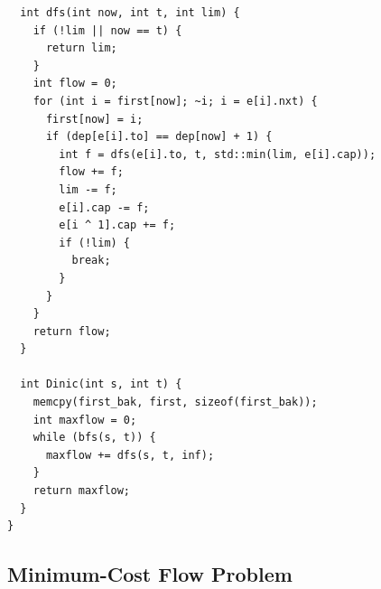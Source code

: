 \documentclass[9pt,landscape]{article}
\begin{document}
\begin{multicols}{2}
\begin{lstlisting}
  int dfs(int now, int t, int lim) {
    if (!lim || now == t) {
      return lim;
    }
    int flow = 0;
    for (int i = first[now]; ~i; i = e[i].nxt) {
      first[now] = i;
      if (dep[e[i].to] == dep[now] + 1) {
        int f = dfs(e[i].to, t, std::min(lim, e[i].cap));
        flow += f;
        lim -= f;
        e[i].cap -= f;
        e[i ^ 1].cap += f;
        if (!lim) {
          break;
        }
      }
    }
    return flow;
  }

  int Dinic(int s, int t) {
    memcpy(first_bak, first, sizeof(first_bak));
    int maxflow = 0;
    while (bfs(s, t)) {
      maxflow += dfs(s, t, inf);
    }
    return maxflow;
  }
}
\end{lstlisting}

\subsection{Minimum-Cost Flow Problem}


\end{multicols}
\end{document}
